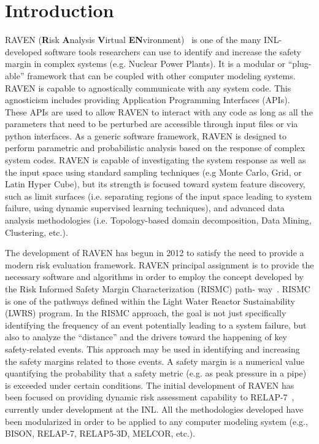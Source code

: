 \section{Introduction}
\label{sec:introduction}
RAVEN (\textbf{R}isk \textbf{A}nalysis \textbf{V}irtual \textbf{EN}vironment)~\cite{Nureg1150}  is one of the many INL-developed software tools researchers can 
use to identify and 
increase the safety margin in complex systems (e.g. Nuclear Power Plants). It is a modular or ``plug-able'' framework that can be coupled with other computer 
modeling systems. RAVEN is capable to agnostically communicate with any system 
code. This agnosticism includes providing Application Programming Interfaces (APIs). These APIs are used to allow RAVEN to interact with any code as long as all 
the parameters that need to be perturbed are accessible through input files or via python interfaces. 
As a generic software framework, RAVEN is designed to perform parametric and probabilistic analysis based on the response of complex system codes. RAVEN is 
capable of investigating the system response as well as the input space using standard sampling techniques (e.g Monte Carlo, Grid, or Latin Hyper Cube), but its 
strength is focused toward system feature discovery, such as limit surfaces (i.e. separating regions of the input space leading to system failure, using dynamic 
supervised learning techniques), and advanced data analysis methodologies (i.e. Topology-based domain decomposition, Data Mining, Clustering, etc.).

The development of RAVEN has begun in 2012 to satisfy the need to provide a modern risk evaluation framework. RAVEN principal assignment is to provide the 
necessary software and algorithms in order to employ the concept developed by the Risk Informed Safety Margin Characterization (RISMC) path-
way~\cite{RISMC}. 
RISMC is one of the pathways defined within the Light Water Reactor Sustainability (LWRS) program. In the RISMC approach, the goal is not just specifically 
identifying the frequency of an event potentially leading to a system failure, but also to analyze the ``distance'' and the drivers toward the happening of key 
safety-related events. This approach may be used in identifying and increasing the safety margins related to those events. A safety margin is a numerical value 
quantifying the probability that a safety metric (e.g. as peak pressure in a pipe) is exceeded under certain conditions. The initial development of RAVEN has 
been focused on providing dynamic risk assessment capability to RELAP-7~\cite{RELAP7}, currently under development at the INL. All the methodologies
developed have been modularized in order to be applied to any computer modeling system (e.g., BISON, RELAP-7, RELAP5-3D, MELCOR, etc.).

